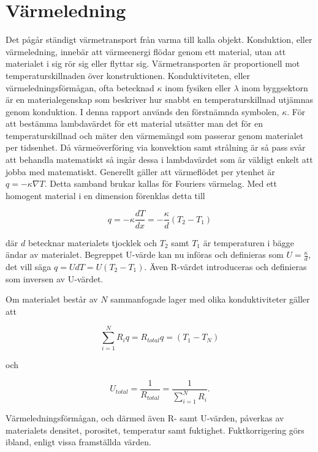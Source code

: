 \section{Värmeledning}\label{sec:heatconduction}

Det pågår ständigt värmetransport från varma till kalla objekt. Konduktion, eller värmeledning, innebär att värmeenergi flödar genom ett material, utan att materialet i sig rör sig eller flyttar sig. Värmetransporten är proportionell mot temperaturskillnaden över konstruktionen. Konduktiviteten, eller värmeledningsförmågan, ofta betecknad $\kappa$ inom fysiken eller $\lambda$ inom byggsektorn är en materialegenskap som beskriver hur snabbt en temperaturskillnad utjämnas genom konduktion. I denna rapport används den förstnämnda symbolen, $\kappa$. För att bestämma lambdavärdet för ett material utsätter man det för en temperaturskillnad och mäter den värmemängd som passerar genom materialet per tidsenhet. Då värmeöverföring via konvektion samt strålning är så pass svår att behandla matematiskt så ingår dessa i lambdavärdet som är väldigt enkelt att jobba med matematiskt. Generellt gäller att värmeflödet per ytenhet är $q = - \kappa \nabla T$. Detta samband brukar kallas för Fouriers värmelag. Med ett homogent material i en dimension förenklas detta till

\begin{equation}\boxed{ \; \; \;
q = -\kappa \frac{dT}{dx} = -\frac{\kappa}{d}\left( T_2-T_1\right)
\; \; \; }
\end{equation}

där $d$ betecknar materialets tjocklek och $T_2$ samt $T_1$ är temperaturen i bägge ändar av materialet. Begreppet U-värde kan nu införas och definieras som $U = \frac{\kappa}{d}$, det vill säga $q = UdT = U\left( T_2-T_1 \right)$. Även R-värdet introduceras och definieras som inversen av U-värdet.

Om materialet består av $N$ sammanfogade lager med olika konduktiviteter gäller att

\begin{equation}
\sum_{i=1}^N R_i q = R_{total}q = \left( T_{1} - T_{N} \right)
\end{equation} 

och 

\begin{equation}
U_{total} = \frac{1}{R_{total}} = \frac{1}{\sum_{i=1}^N R_i}.
\end{equation}

Värmeledningsförmågan, och därmed även R- samt U-värden, påverkas av materialets densitet, porositet, temperatur samt fuktighet. Fuktkorrigering görs ibland, enligt vissa framställda värden.

